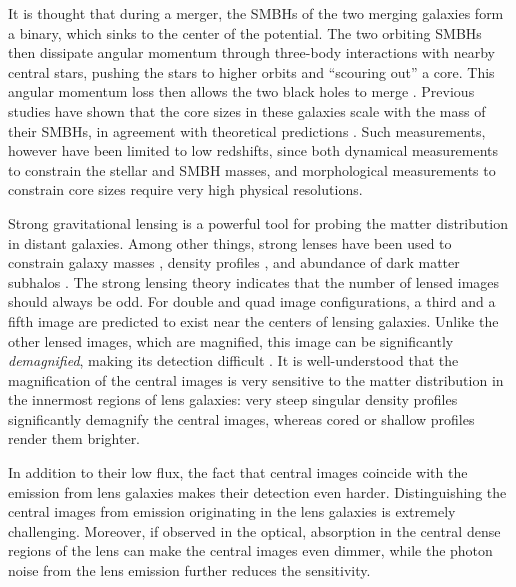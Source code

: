 \documentclass[chicago]{emulateapj}
\begin{document}
It is thought that during a merger, the SMBHs of the two merging galaxies form a binary, which sinks to the center of the potential. The two orbiting SMBHs then dissipate angular momentum through three-body interactions with nearby central stars, pushing the stars to higher orbits and ``scouring out'' a core. This angular momentum loss then allows the two black holes to merge \citep{Begelman:80}.
Previous studies have shown that the core sizes in these galaxies scale with the mass of their SMBHs, in agreement with theoretical predictions \citep{Kormendy:09,Kormendy:13}.
Such measurements, however have been limited to low redshifts, since both dynamical measurements to constrain the stellar and SMBH masses, and morphological measurements to constrain core sizes require very high physical resolutions. 

Strong gravitational lensing is a powerful tool for probing the matter distribution in distant galaxies. Among other things, strong lenses have been used to constrain galaxy masses  \citep[e.g.][]{}, density profiles \citep[e.g.][]{}, and abundance of dark matter subhalos \citep[e.g.][]{}.
The strong lensing theory indicates that the number of lensed images should always be odd. For double and quad image configurations, a third and a fifth image are predicted to exist near the centers of lensing galaxies. Unlike the other lensed images, which are magnified, this image can be significantly \emph{demagnified}, making its detection difficult \citep[e.g.,][]{Jackson:13}.  It is well-understood that the magnification of the central images is very sensitive to the matter distribution in the innermost regions of lens galaxies: very steep singular density profiles significantly demagnify the central images, whereas cored or shallow profiles render them brighter. %

In addition to their low flux, the fact that central images coincide with the emission from lens galaxies makes their detection even harder. Distinguishing the central images from emission originating in the lens galaxies is extremely challenging.
Moreover, if observed in the optical, absorption in the central dense regions of the lens can make the central images even dimmer, while the photon noise from the lens emission further reduces the sensitivity. 
\end{document}
